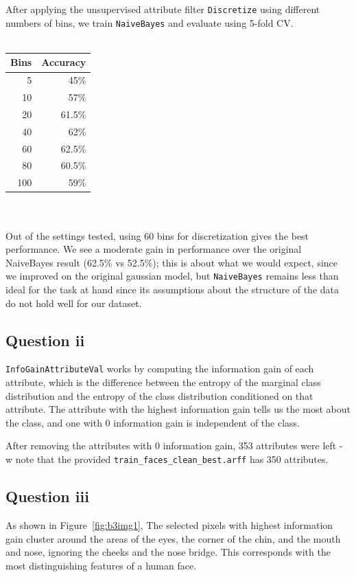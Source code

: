 \documentclass[a4paper]{article}
\begin{document}
After applying the unsupervised attribute filter {\tt Discretize} using different numbers of bins, we train {\tt NaiveBayes} and evaluate using 5-fold CV.\\
\\
\begin{tabular}{rr}
Bins & Accuracy\\
\hline
5 & 45\% \\
10 & 57\% \\
20 & 61.5\% \\
40 & 62\% \\
60 & 62.5\% \\
80 & 60.5\% \\
100 & 59\%
\end{tabular}\\
\\
Out of the settings tested, using 60 bins for discretization gives the best performance. We see a moderate gain in performance over the original NaiveBayes result (62.5\% vs 52.5\%); this is about what we would expect, since we improved on the original gaussian model, but {\tt NaiveBayes} remains less than ideal for the task at hand since its assumptions about the structure of the data do not hold well for our dataset.

\subsection*{Question ii}
{\tt InfoGainAttributeVal} works by computing the information gain of each attribute, which is the difference between the entropy of the marginal class distribution and the entropy of the class distribution conditioned on that attribute. The attribute with the highest information gain tells us the most about the class, and one with 0 information gain is independent of the class.

After removing the attributes with 0 information gain, 353 attributes were left - w note that the provided {\tt train\_faces\_clean\_best.arff} has 350 attributes.

\subsection*{Question iii}
As shown in Figure~\ref{fig:b3img1}, The selected pixels with highest information gain cluster around the areas of the eyes, the corner of the chin, and the mouth and nose, ignoring the cheeks and the nose bridge. This corresponds with the most distinguishing features of a human face.
\end{document}
